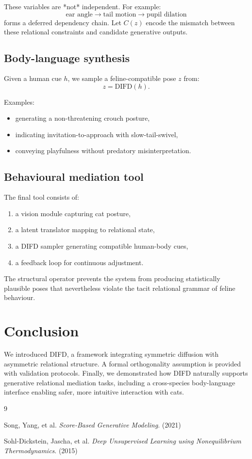 \documentclass[11pt]{article}
\begin{document}
These variables are *not* independent. For example:
\[
\text{ear angle} \to \text{tail motion} \to \text{pupil dilation}
\]
forms a deferred dependency chain. Let $C(z)$ encode the mismatch between 
these relational constraints and candidate generative outputs.

\subsection{Body-language synthesis}

Given a human cue $h$, we sample a feline-compatible pose $z$ from:
\[
z = \mathrm{DIFD}(h).
\]

Examples:
\begin{itemize}[itemsep=2pt]
    \item generating a non-threatening crouch posture,
    \item indicating invitation-to-approach with slow-tail-swivel,
    \item conveying playfulness without predatory misinterpretation.
\end{itemize}

\subsection{Behavioural mediation tool}

The final tool consists of:
\begin{enumerate}[itemsep=3pt]
    \item a vision module capturing cat posture,
    \item a latent translator mapping to relational state,
    \item a DIFD sampler generating compatible human-body cues,
    \item a feedback loop for continuous adjustment.
\end{enumerate}

The structural operator prevents the system from producing statistically plausible
poses that nevertheless violate the tacit relational grammar of feline behaviour.

\section{Conclusion}

We introduced DIFD, a framework integrating symmetric diffusion with 
asymmetric relational structure. A formal orthogonality assumption is provided 
with validation protocols. Finally, we demonstrated how DIFD naturally supports 
generative relational mediation tasks, including a cross-species 
body-language interface enabling safer, more intuitive interaction with cats.


\begin{thebibliography}{9}

Song, Yang, et al.
\emph{Score-Based Generative Modeling}. (2021)

Sohl-Dickstein, Jascha, et al.
\emph{Deep Unsupervised Learning using Nonequilibrium Thermodynamics}. (2015)

\end{thebibliography}
\end{document}
